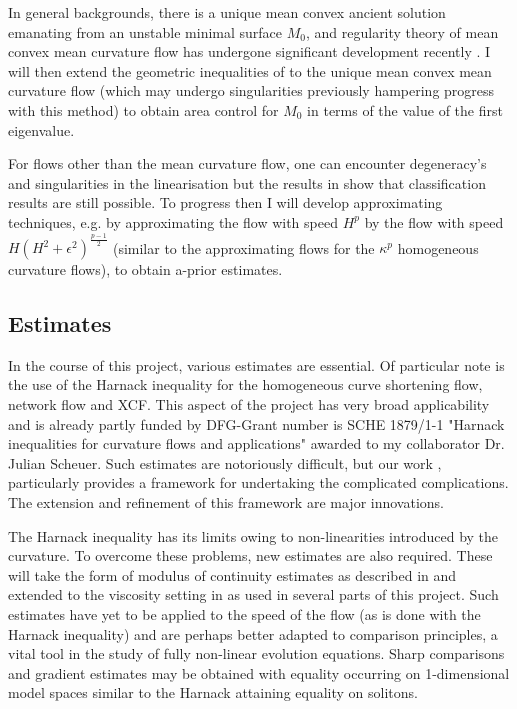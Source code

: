 \documentclass[12pt]{amsart}
\begin{document}
In general backgrounds, there is a unique mean convex ancient solution emanating from an unstable minimal surface $M_0$, and regularity theory of mean convex mean curvature flow has undergone significant development recently \cite{2013arXiv1304.0926H,MR3570481}. I will then extend the geometric inequalities of \cite{MR1650335} to the unique mean convex mean curvature flow (which may undergo singularities previously hampering progress with this method) to obtain area control for $M_0$ in terms of the value of the first eigenvalue.

For flows other than the mean curvature flow, one can encounter degeneracy's and singularities in the linearisation but the results in \cite{2016arXiv160401694B} show that classification results are still possible. To progress then I will develop approximating techniques, e.g. by approximating the flow with speed $H^p$ by the flow with speed $H (H^2 + \epsilon^2)^{\tfrac{p-1}{2}}$ (similar to the approximating flows for the $\kappa^p$ homogeneous curvature flows), to obtain a-prior estimates.

\subsection*{Estimates}
\label{sec-3-6}

In the course of this project, various estimates are essential. Of particular note is the use of the Harnack inequality for the homogeneous curve shortening flow, network flow and XCF. This aspect of the project has very broad applicability and is already partly funded by DFG-Grant number is SCHE 1879/1-1 "Harnack inequalities for curvature flows and applications" awarded to my collaborator Dr. Julian Scheuer. Such estimates are notoriously difficult, but our work \cite{2015arXiv150802821B,2015arXiv151203374B}, particularly \cite{BIS4} provides a framework for undertaking the complicated complications. The extension and refinement of this framework are major innovations.

The Harnack inequality has its limits owing to non-linearities introduced by the curvature. To overcome these problems, new estimates are also required. These will take the form of modulus of continuity estimates as described in \cite{MR3381494} and extended to the viscosity setting in \cite{MR3606561} as used in several parts of this project. Such estimates have yet to be applied to the speed of the flow (as is done with the Harnack inequality) and are perhaps better adapted to comparison principles, a vital tool in the study of fully non-linear evolution equations. Sharp comparisons and gradient estimates may be obtained with equality occurring on 1-dimensional model spaces similar to the Harnack attaining equality on solitons.
\end{document}
